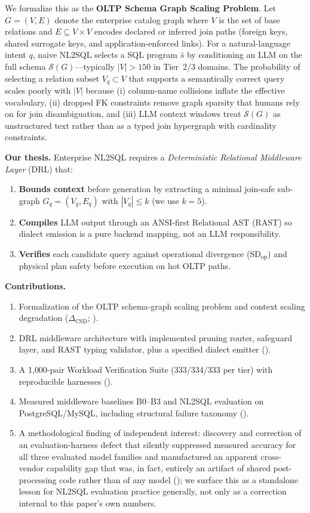 \documentclass[twocolumn]{svjour3}
\begin{document}
We formalize this as the \textbf{OLTP Schema Graph Scaling Problem}.
Let $G=(V,E)$ denote the enterprise catalog graph where $V$ is the set of base relations and $E\subseteq V\times V$ encodes declared or inferred join paths (foreign keys, shared surrogate keys, and application-enforced links).
For a natural-language intent $q$, naive NL2SQL selects a SQL program $\hat{s}$ by conditioning an LLM on the full schema $\mathcal{S}(G)$---typically $|V|>150$ in Tier~2/3 domains.
The probability of selecting a relation subset $V_q\subset V$ that supports a semantically correct query scales poorly with $|V|$ because (i) column-name collisions inflate the effective vocabulary, (ii) dropped FK constraints remove graph sparsity that humans rely on for join disambiguation, and (iii) LLM context windows treat $\mathcal{S}(G)$ as unstructured text rather than as a typed join hypergraph with cardinality constraints.

\textbf{Our thesis.} Enterprise NL2SQL requires a \emph{Deterministic Relational Middleware Layer} (DRL) that:
\begin{enumerate}[label=(\roman*)]
  \item \textbf{Bounds context} before generation by extracting a minimal join-safe sub-graph $G_q=(V_q,E_q)$ with $|V_q|\le k$ (we use $k{=}5$).
  \item \textbf{Compiles} LLM output through an ANSI-first Relational AST (RAST) so dialect emission is a pure backend mapping, not an LLM responsibility.
  \item \textbf{Verifies} each candidate query against operational divergence ($\text{SD}_{\text{op}}$) and physical plan safety before execution on hot OLTP paths.
\end{enumerate}

\textbf{Contributions.}
\begin{enumerate}[label=(\arabic*)]
  \item Formalization of the OLTP schema-graph scaling problem and context scaling degradation ($\Delta_{\text{CSD}}$; ).
  \item DRL middleware architecture with implemented pruning router, safeguard layer, and RAST typing validator, plus a specified dialect emitter ().
  \item A 1{,}000-pair Workload Verification Suite (333/334/333 per tier) with reproducible harnesses ().
  \item Measured middleware baselines B0--B3 and NL2SQL evaluation on PostgreSQL/MySQL, including structural failure taxonomy ().
  \item A methodological finding of independent interest: discovery and correction of an evaluation-harness defect that silently suppressed measured accuracy for all three evaluated model families and manufactured an apparent cross-vendor capability gap that was, in fact, entirely an artifact of shared post-processing code rather than of any model (); we surface this as a standalone lesson for NL2SQL evaluation practice generally, not only as a correction internal to this paper's own numbers.
\end{enumerate}
\end{document}

